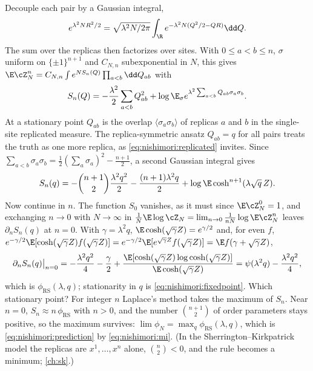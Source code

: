\begin{refsection}
\begin{heuristic}
Decouple each pair by a Gaussian integral,
\[
e^{\lambda^2NR^2/2}=\sqrt{\lambda^2N/2\pi}\int_\R e^{-\lambda^2N(Q^2/2-QR)}\dd Q.
\]
The sum over the replicas then factorizes over sites. With $0\le a<b\le n$, $\sigma$ uniform on $\{\pm1\}^{n+1}$ and $C_{N,n}$ subexponential in $N$, this gives $\E\cZ_N^n=C_{N,n}\int e^{NS_n(Q)}\prod_{a<b}\dd Q_{ab}$ with
\[
S_n(Q)=-\frac{\lambda^2}2\sum_{a<b}Q_{ab}^2+\log\E_\sigma e^{\lambda^2\sum_{a<b}Q_{ab}\sigma_a\sigma_b}.
\]
At a stationary point $Q_{ab}$ is the overlap $\langle\sigma_a\sigma_b\rangle$ of replicas $a$ and $b$ in the single-site replicated measure. The replica-symmetric ansatz $Q_{ab}=q$ for all pairs treats the truth as one more replica, as \eqref{eq:nishimori:replicated} invites. Since $\sum_{a<b}\sigma_a\sigma_b=\frac12(\sum_a\sigma_a)^2-\frac{n+1}2$, a second Gaussian integral gives
\[
S_n(q)=-\binom{n+1}2\frac{\lambda^2q^2}2-\frac{(n+1)\lambda^2q}2+\log\E\cosh^{n+1}(\lambda\sqrt q\,Z).
\]
Now continue in $n$. The function $S_0$ vanishes, as it must since $\E\cZ_N^0=1$, and exchanging $n\to0$ with $N\to\infty$ in $\frac1N\E\log\cZ_N=\lim_{n\to0}\frac1{nN}\log\E\cZ_N^n$ leaves $\partial_nS_n(q)$ at $n=0$. With $\gamma=\lambda^2q$, $\E\cosh(\sqrt\gamma Z)=e^{\gamma/2}$ and, for even $f$, $e^{-\gamma/2}\E[\cosh(\sqrt\gamma Z)f(\sqrt\gamma Z)]=e^{-\gamma/2}\E[e^{\sqrt\gamma Z}f(\sqrt\gamma Z)]=\E f(\gamma+\sqrt\gamma Z)$,
\[
\partial_nS_n(q)\big|_{n=0}=-\frac{\lambda^2q^2}4-\frac\gamma2+\frac{\E[\cosh(\sqrt\gamma Z)\log\cosh(\sqrt\gamma Z)]}{\E\cosh(\sqrt\gamma Z)}=\psi(\lambda^2q)-\frac{\lambda^2q^2}4,
\]
which is $\phi_{\mathrm{RS}}(\lambda,q)$; stationarity in $q$ is \eqref{eq:nishimori:fixedpoint}. Which stationary point? For integer $n$ Laplace's method takes the maximum of $S_n$. Near $n=0$, $S_n\approx n\,\phi_{\mathrm{RS}}$ with $n>0$, and the number $\binom{n+1}2$ of order parameters stays positive, so the maximum survives: $\lim\phi_N=\max_q\phi_{\mathrm{RS}}(\lambda,q)$, which is \eqref{eq:nishimori:prediction} by \eqref{eq:nishimori:mi}. (In the Sherrington--Kirkpatrick model the replicas are $x^1,\dots,x^n$ alone, $\binom n2<0$, and the rule becomes a minimum; \cref{ch:sk}.)
\end{heuristic}


\end{refsection}

